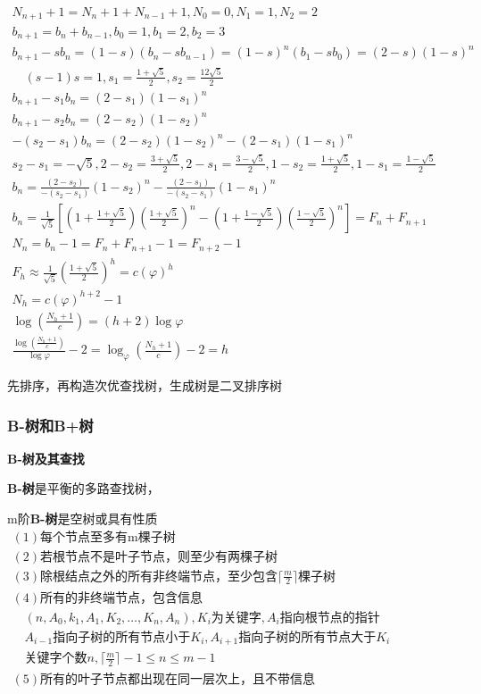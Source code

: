 \documentclass[UTF8]{ctexart}
\newcommand{\mt}[1]{\text{#1}}
\newcommand{\mb}[1]{\textbf{#1}}
\newcommand{\mf}[1]{\left( #1\right)}
\newcommand{\mfc}[1]{\left[ #1 \right]}
\newcommand{\q}{\quad}
\newcommand{\p}{\par}
\newcommand{\ma}[1]{\begin{array}{llll} #1 \end{array}}
\begin{document}
$
\ma{
N_{n+1}+1=N_n+1+N_{n-1}+1,N_0=0,N_1=1,N_2=2\\
b_{n+1}=b_n+b_{n-1},b_0=1,b_1=2,b_2=3\\
b_{n+1}-s b_n=(1-s)(b_n-s b_{n-1})=(1-s)^n(b_1-s b_0)=(2-s)(1-s)^n\\
    \q  (s-1)s=1, s_1=\frac{1+\sqrt{5}}{2},s_2=\frac{12\sqrt{5}}{2}\\
b_{n+1}-s_1 b_n=(2-s_1)(1-s_1)^n\\
b_{n+1}-s_2 b_n=(2-s_2)(1-s_2)^n\\
-(s_2-s_1)b_n=(2-s_2)(1-s_2)^n-(2-s_1)(1-s_1)^n\\
s_2-s_1=-\sqrt{5},2-s_2=\frac{3+\sqrt{5}}{2},2-s_1=\frac{3-\sqrt{5}}{2},1-s_2=\frac{1+\sqrt{5}}{2},1-s_1=\frac{1-\sqrt{5}}{2}\\
b_n=\frac{(2-s_2)}{-(s_2-s_1)}(1-s_2)^n-\frac{(2-s_1)}{-(s_2-s_1)}(1-s_1)^n\\
b_n=\frac{1}{\sqrt{5}}\mfc{(1+\frac{1+\sqrt{5}}{2})(\frac{1+\sqrt{5}}{2})^n - (1+\frac{1-\sqrt{5}}{2})(\frac{1-\sqrt{5}}{2})^n }=F_n+F_{n+1}\\
N_n=b_n-1=F_n+F_{n+1}-1=F_{n+2}-1\\
F_h \approx \frac{1}{\sqrt{5}}\mf{\frac{1+\sqrt{5}}{2}}^h=c(\varphi)^h\\
N_h=c(\varphi)^{h+2}-1\\
\log (\frac{N_h+1}{c})=(h+2)\log \varphi\\
\frac{\log (\frac{N_h+1}{c})}{\log \varphi}-2=\log _\varphi (\frac{N_h+1}{c}) -2=h
}
$

 先排序，再构造次优查找树，生成树是二叉排序树



\newpage

\subsubsection{B-树和B+树}

\mb{B-树及其查找}\p

\mb{B-树}是平衡的多路查找树，

m阶\mb{B-树}是空树或具有性质$\ma{
    (1)\mt{每个节点至多有m棵子树}\\
    (2)\mt{若根节点不是叶子节点，则至少有两棵子树}\\
    (3)\mt{除根结点之外的所有非终端节点，至少包含} \lceil \frac{m}{2} \rceil\mt{棵子树}\\
    (4)\mt{所有的非终端节点，包含信息}\\
        \q (n,A_0,k_1,A_1,K_2,\dots,K_n,A_n),
        K_i\mt{为关键字},A_i\mt{指向根节点的指针}\\
        \q A_{i-1}\mt{指向子树的所有节点小于} K_i,
        A_{i+1}\mt{指向子树的所有节点大于} K_i\\
        \q \mt{关键字个数}n ,\lceil \frac{m}{2} \rceil -1  \leqslant n\leqslant m-1\\
    (5)\mt{所有的叶子节点都出现在同一层次上，且不带信息}\\
}$
\end{document}
